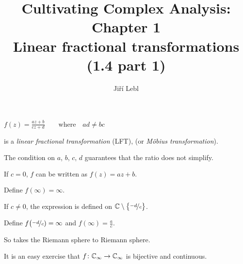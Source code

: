 \documentclass[10pt,aspectratio=169]{beamer}
\author{Ji\v{r}\'i Lebl}
\institute[OSU]{%
Departemento pri Matematiko de Oklahoma {\^S}tata Universitato}
\title{Cultivating Complex Analysis: Chapter 1\\%
Linear fractional transformations (1.4 part 1)}
\date{}
\begin{document}
\begin{frame}
\titlepage
\end{frame}

\begin{frame}
$\displaystyle
f(z) = \frac{a z + b}{c z + d}
\qquad \text{where} \quad ad \not= bc
$
\medskip

is a \emph{linear fractional transformation} (LFT), (or \emph{M\"obius
transformation}).

\medskip
\pause

The condition on $a$, $b$, $c$, $d$ guarantees that the ratio does not
simplify.

\medskip
\pause

If $c=0$, $f$ can be written as $f(z)=az+b$.

\medskip

Define $f(\infty) = \infty$.

\medskip
\pause

If $c\not=0$, the expression is defined on
${\mathbb{C}} \setminus \bigl\{ \nicefrac{-d}{c} \bigr\}$.

\medskip

Define $f\bigl(\nicefrac{-d}{c}) = \infty$ and 
$f(\infty) = \frac{a}{c}$.

\medskip
\pause

So takes the Riemann sphere to Riemann sphere.

\medskip

It is an easy exercise that $f \colon {\mathbb{C}}_\infty \to {\mathbb{C}}_\infty$ is bijective and continuous.

\end{frame}
\end{document}
